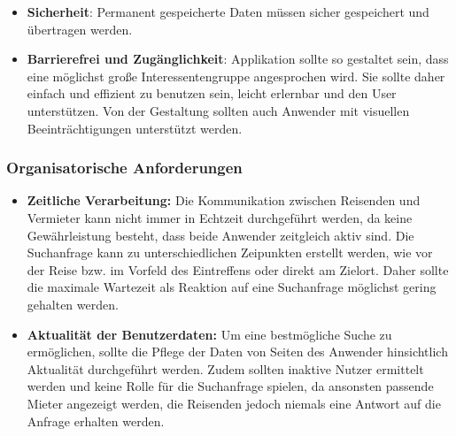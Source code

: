 \begin{itemize}
   \item
   \textbf{Sicherheit}: Permanent gespeicherte Daten müssen sicher gespeichert und übertragen werden. 

   \item
   \textbf{Barrierefrei und Zugänglichkeit}: Applikation sollte so gestaltet sein, dass eine möglichst große Interessentengruppe angesprochen wird. Sie sollte daher einfach und effizient zu benutzen sein, leicht erlernbar und den User unterstützen. Von der  Gestaltung sollten auch Anwender mit visuellen Beeinträchtigungen unterstützt werden.
\end{itemize}



\subsubsection{Organisatorische Anforderungen}          
\begin{itemize}
     \item
   \textbf{Zeitliche Verarbeitung:} Die Kommunikation zwischen Reisenden und Vermieter kann nicht immer in Echtzeit durchgeführt werden, da keine Gewährleistung besteht, dass beide Anwender zeitgleich aktiv sind. Die Suchanfrage kann zu unterschiedlichen Zeipunkten erstellt werden, wie vor der Reise bzw. im Vorfeld des Eintreffens oder direkt am Zielort. Daher sollte die maximale Wartezeit als Reaktion auf eine Suchanfrage möglichst gering gehalten werden. 

   \item 
   \textbf{Aktualität der Benutzerdaten:} Um eine bestmögliche Suche zu ermöglichen, sollte die Pflege der Daten von Seiten des Anwender hinsichtlich Aktualität durchgeführt werden. Zudem sollten inaktive Nutzer ermittelt werden und keine Rolle für die Suchanfrage spielen, da ansonsten passende Mieter angezeigt werden, die Reisenden jedoch niemals eine Antwort auf die Anfrage erhalten werden.

\end{itemize}
